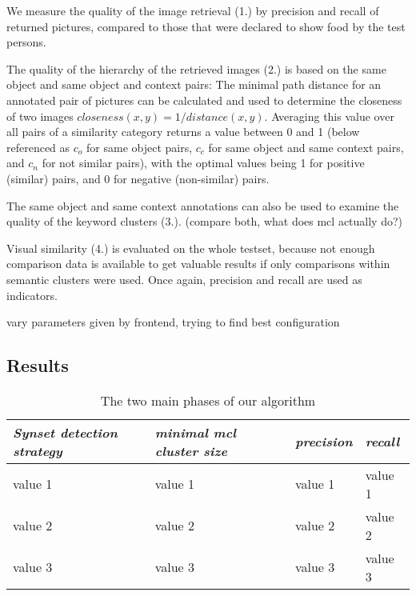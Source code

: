 We measure the quality of the image retrieval (1.) by precision and recall of returned pictures, compared to those that were declared to show food by the test persons.  

The quality of the hierarchy of the retrieved images (2.) is based on the same object and same object and context pairs: The  minimal path distance for an annotated pair of pictures can be calculated and used to determine the closeness of two images $closeness(x,y) = 1/distance(x,y)$. Averaging this value over all pairs of a similarity category returns a value between 0 and 1 (below referenced as $c_o$ for same object pairs, $c_c$ for same object and same context pairs, and $c_n$ for not similar pairs), with the optimal values being 1 for positive (similar) pairs, and 0 for negative (non-similar) pairs.

The same object and same context annotations can also be used to examine the quality of the keyword clusters (3.).  (compare both, what does mcl actually do?)

Visual similarity (4.) is evaluated on the whole testset, because not enough comparison data is available to get valuable results if only comparisons within semantic clusters were used. Once again, precision and recall are used as indicators.

vary parameters given by frontend, trying to find best configuration

\subsection{Results}

\begin{table}[h]
    \begin{tabular}{| p{1.8cm} | p{1.8cm} || p{1.5cm} | p{1.5cm} |}
    \hline
    \emph{Synset detection strategy} & \emph{minimal mcl cluster size} & \emph{precision} & \emph{recall} \\ \hline
    value 1 		& value 1 	& value 1	& value 1 \\ \hline
    value 2 		& value 2 	& value 2	& value 2 \\ \hline
    value 3	 	& value 3 	& value 3	& value 3 \\
    \hline
    \end{tabular}
    \caption{The two main phases of our algorithm}
	\label{tab_retrievalevaluation}
\end{table}

